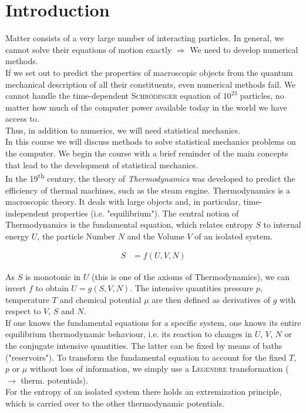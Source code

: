\chapter{Introduction}

Matter consists of a very large number of interacting particles. In general, we cannot solve their equations of motion exactly $\Rightarrow$ We need to develop numerical methods.\\
If we set out to predict the properties of macroscopic objects from the quantum mechanical description of all their constituents, even numerical methods fail. We cannot handle the time-dependent \textsc{Schrödinger} equation of $10^{23}$ particles, no matter how much of the computer power available today in the world we have access to.\\
Thus, in addition to numerics, we will need statistical mechanics.\\
In this course we will discuss methods to solve statistical mechanics problems on the computer. We begin the course with a brief reminder of the main concepts that lead to the development of statistical mechanics.\\

In the 19\textsuperscript{th} century, the theory of \emph{Thermodynamics} was developed to predict the efficiency of thermal machines, such as the steam engine. Thermodynamics is a macroscopic theory. It deals with large objects and, in particular, time-independent properties (i.e. "equilibrium"). The central notion of Thermodynamics is the fundamental equation, which relates entropy $S$ to internal energy $U$, the particle Number $N$ and the Volume $V$ of an isolated system.

\begin{align}
S &= f(U, V, N)
\end{align}

As $S$ is monotonic in $U$ (this is one of the axioms of Thermodynamics), we can invert $f$ to obtain $U = g(S, V, N)$. The intensive quantities pressure $p$, temperature $T$ and chemical potential $\mu$ are then defined as derivatives of $g$ with respect to $V$, $S$ and $N$.\\
If one knows the fundamental equations for a specific system, one knows its entire equilibrium thermodynamic behaviour, i.e. its reaction to changes in $U$, $V$, $N$ or the conjugate intensive quantities. The latter can be fixed by means of baths ("reservoirs"). To transform the fundamental equation to account for the fixed $T$, $p$ or $\mu$ without loss of information, we simply use a \textsc{Legendre} transformation ($\rightarrow$ therm. potentials).\\
For the entropy of an isolated system there holds an extremization principle, which is carried over to the other thermodynamic potentials.\\

